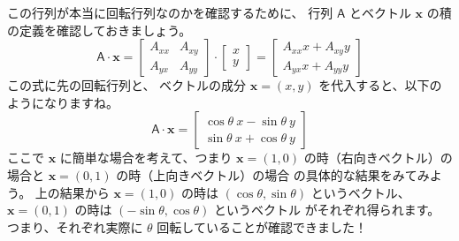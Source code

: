 \documentclass[dvipdfmx,autodetect-engine,10pt,b5paper,papersize,openany,dvipsnames]{jsbook}
\begin{document}
\begin{multicols}{2}
この行列が本当に回転行列なのかを確認するために、
行列 $\mathsf{A}$ とベクトル $\bm{x}$ の積の定義を確認しておきましょう。
\begin{equation*}
  \mathsf{A}\cdot\bm{x}
  =
  \left[
  \begin{array}{cc}
    A_{xx} & A_{xy} \\
    A_{yx} & A_{yy}
  \end{array}
  \right]
  \cdot
  \left[
  \begin{array}{c}
    x \\
    y
  \end{array}
  \right]
  =	
  \left[
  \begin{array}{c}
    A_{xx} x + A_{xy} y \\
    A_{yx} x + A_{yy} y
    \end{array}
  \right]
\end{equation*}
この式に先の回転行列と、
ベクトルの成分 $\bm{x} = (x, y)$ を代入すると、以下のようになりますね。
\begin{equation*}
  \mathsf{A}\cdot\bm{x}
  =	
  \left[
  \begin{array}{c}
    \cos\theta\ x - \sin\theta\ y \\
    \sin\theta\ x + \cos\theta\ y
  \end{array}
  \right]
\end{equation*}
ここで $\bm{x}$ に簡単な場合を考えて、つまり
$\bm{x} = (1, 0)$ の時（右向きベクトル）の場合と
$\bm{x} = (0, 1)$ の時（上向きベクトル）の場合
の具体的な結果をみてみよう。
上の結果から
$\bm{x} = (1, 0)$ の時は $(\cos\theta, \sin\theta)$ というベクトル、
$\bm{x} = (0, 1)$ の時は $(-\sin\theta, \cos\theta)$ というベクトル
がそれぞれ得られます。
つまり、それぞれ実際に $\theta$ 回転していることが確認できました！



\end{multicols}
\end{document}
